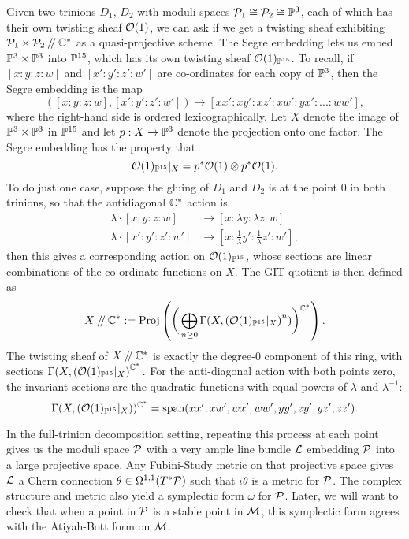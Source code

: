 	Given two trinions $D_1$, $D_2$ with moduli spaces $\mathcal{P}_1 \cong \mathcal{P}_2 \cong \mathbb{P}^3$, each of which has their own twisting sheaf $\mathcal{O}(1)$, we can ask if we get a twisting sheaf exhibiting $\mathcal{P}_1 \times \mathcal{P}_2 \mathbin{/\mkern-4mu/} \mathbb{C}^\ast$ as a quasi-projective scheme. The Segre embedding lets us embed $\mathbb{P}^3 \times \mathbb{P}^3$ into $\mathbb{P}^{15}$, which has its own twisting sheaf $\mathcal{O}(1)_{\mathbb{P}^{15}}$. To recall, if $[x:y:z:w]$ and $[x':y':z':w']$ are co-ordinates for each copy of $\mathbb{P}^3$, then the Segre embedding is the map
	\begin{equation}
		\label{e:segre}
		([x:y:z:w], [x':y':z':w']) \to [xx':xy':xz':xw':yx':...:ww'],
	\end{equation}
	where the right-hand side is ordered lexicographically. Let $X$ denote the image of $\mathbb{P}^3\times \mathbb{P}^3$ in $\mathbb{P}^{15}$ and let $p:X\to \mathbb{P}^3$ denote the projection onto one factor. The Segre embedding has the property that
	\begin{equation}
		\mathcal{O}(1)_{\mathbb{P}^{15}}|_X = p^\ast \mathcal{O}(1) \otimes p^\ast \mathcal{O}(1).
	\end{equation}
	To do just one case, suppose the gluing of $D_1$ and $D_2$ is at the point $0$ in both trinions, so that the antidiagonal $\mathbb{C}^\ast$ action is
	\begin{align*}
		\lambda \cdot [x:y:z:w] &\to [x:\lambda y:\lambda z: w]\\
		\lambda \cdot [x':y':z':w']&\to [x:\frac{1}{\lambda}y': \frac{1}{\lambda}z':w'],
	\end{align*}
	then this gives a corresponding action on $\mathcal{O}(1)_{\mathbb{P}^{15}}$, whose sections are linear combinations of the co-ordinate functions on $X$. The GIT quotient is then defined as
	\begin{equation}
		X\mathbin{/\mkern-4mu/} \mathbb{C}^\ast := \text{Proj}\left(\bigg(\bigoplus_{n\geq 0} \Gamma(X, \left(\mathcal{O}(1)_{\mathbb{P}^{15}}|_X\right)^n)\bigg)^{\mathbb{C}^\ast}\right).
	\end{equation}
	The twisting sheaf of $X\mathbin{/\mkern-4mu/} \mathbb{C}^\ast$ is exactly the degree-0 component of this ring, with sections $\Gamma(X, \left(\mathcal{O}(1)_{\mathbb{P}^{15}}|_X\right)^{\mathbb{C}^\ast}.$ For the anti-diagonal action with both points zero, the invariant sections are the quadratic functions with equal powers of $\lambda$ and $\lambda^{-1}$:
	\begin{equation}
		\Gamma(X, \left(\mathcal{O}(1)_{\mathbb{P}^{15}}|_X\right))^{\mathbb{C}^\ast} = \text{span}(xx',xw',wx',ww',yy',zy',yz',zz').
	\end{equation}
	
	In the full-trinion decomposition setting, repeating this process at each point gives us the moduli space $\mathcal{P}$ with a very ample line bundle $\mathcal{L}$ embedding $\mathcal{P}$ into a large projective space. Any Fubini-Study metric on that projective space gives $\mathcal{L}$ a Chern connection $\theta \in \Omega^{1,1}(T^\ast \mathcal{P})$ such that $i\theta$ is a metric for $\mathcal{P}$. The complex structure and metric also yield a symplectic form $\omega$ for $\mathcal{P}$. Later, we will want to check that when a point in $\mathcal{P}$ is a stable point in $\mathcal{M}$, this symplectic form agrees with the Atiyah-Bott form on $\mathcal{M}$.
	
